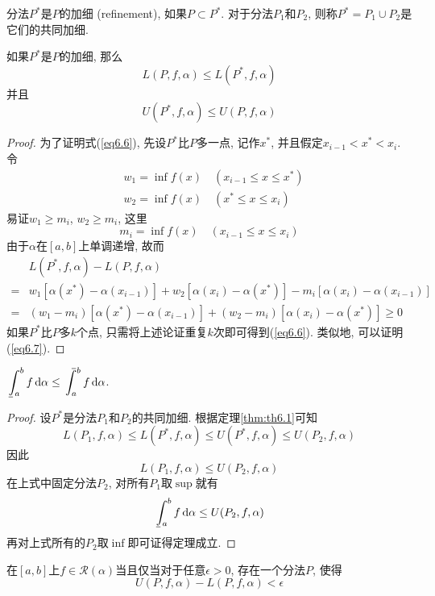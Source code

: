 \documentclass[cn,12pt,math=mtpro2,citestyle=gb7714-2015,bibstyle=gb7714-2015,twocol]{elegantbook}
\newcommand{\da}{\,\text{d}\alpha}
\def\upint{\mathchoice%
    {\mkern13mu\overline{\vphantom{\intop}\mkern7mu}\mkern-20mu}%
    {\mkern7mu\overline{\vphantom{\intop}\mkern7mu}\mkern-14mu}%
    {\mkern7mu\overline{\vphantom{\intop}\mkern7mu}\mkern-14mu}%
    {\mkern7mu\overline{\vphantom{\intop}\mkern7mu}\mkern-14mu}%
  \int}
\def\lowint{\mkern3mu\underline{\vphantom{\intop}\mkern7mu}\mkern-10mu\int}
\begin{document}
\begin{definition}
分法$P^\ast$是$P$的加细 (refinement), 如果$P\subset P^\ast$. 对于分法$P_1$和$P_2$, 则称$P^\ast=P_1\cup P_2$是它们的共同加细.
\end{definition}
\begin{theorem}\label{thm:th6.1}
  如果$P^\ast$是$P$的加细, 那么
  \begin{equation}\label{eq6.6}
    L(P,f,\alpha)\leq L(P^\ast,f,\alpha)
  \end{equation}
  并且
  \begin{equation}\label{eq6.7}
    U(P^\ast,f,\alpha)\leq U(P,f,\alpha)
  \end{equation}
\end{theorem}
\begin{proof}
  为了证明式(\ref{eq6.6}), 先设$P^\ast$比$P$多一点, 记作$x^\ast$, 并且假定$x_{i-1}<x^\ast<x_i$. 令
  \begin{align*}
  &w_1=\inf f(x)\quad (x_{i-1}\leq x \leq x^\ast) \\
  &w_2=\inf f(x)\quad (x^\ast\leq x\leq x_i)
  \end{align*}
  易证$w_1\geq m_i$, $w_2\geq m_i$, 这里
  $$m_i=\inf f(x)\quad (x_{i-1}\leq x\leq x_i)$$
  由于$\alpha$在$[a,b]$上单调递增, 故而
  \begin{align*}
  &L(P^\ast,f,\alpha)-L(P,f,\alpha) \\
  =&w_1[\alpha(x^\ast)-\alpha(x_{i-1})]+w_2[\alpha(x_i)-\alpha(x^\ast)]-m_i[\alpha(x_i)-\alpha(x_{i-1})] \\
  =&(w_1-m_i)[\alpha(x^\ast)-\alpha(x_{i-1})]+(w_2-m_i)[\alpha(x_i)-\alpha(x^\ast)]\geq 0
  \end{align*}
  如果$P^\ast$比$P$多$k$个点, 只需将上述论证重复$k$次即可得到(\ref{eq6.6}). 类似地, 可以证明(\ref{eq6.7}).

\end{proof}
\begin{theorem}\label{thm:th6.2}
  $\displaystyle \lowint_a^b f\da\leq\upint_a^bf\da$.
\end{theorem}
\begin{proof}
  设$P^\ast$是分法$P_1$和$P_2$的共同加细. 根据定理\ref{thm:th6.1}可知
  $$L(P_1,f,\alpha)\leq L(P^\ast,f,\alpha)\leq U(P^\ast,f,\alpha)\leq U(P_2,f,\alpha)$$
  因此
  $$L(P_1,f,\alpha)\leq U(P_2,f,\alpha)$$
  在上式中固定分法$P_2$, 对所有$P_1$取$\sup$就有
  $$\lowint_a^b f\da\leq U(P_2,f,\alpha)$$
  再对上式所有的$P_2$取$\inf$即可证得定理成立.

\end{proof}
\begin{theorem}\label{thm:th6.3}
  在$[a,b]$上$f\in\mathscr{R}(\alpha)$当且仅当对于任意$\epsilon>0$, 存在一个分法$P$, 使得
  \begin{equation}\label{eq6.8}
    U(P,f,\alpha)-L(P,f,\alpha)<\epsilon
  \end{equation}
\end{theorem}
\end{document}
